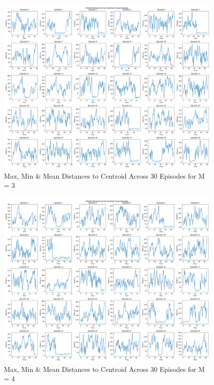 \begin{figure}
    \centering
    \includegraphics[width=0.8\linewidth]{figures/test8_without_trajectory/3_layers_distances_to_centroid.png}
    \caption{Max, Min \& Mean Distances to Centroid Across 30 Episodes for M = 3}
    \label{fig:dist_to_centroid_3_layers_30_ep}
\end{figure}
\begin{figure}
    \centering
    \includegraphics[width=0.8\linewidth]{figures/test8_without_trajectory/4_layers_distances_to_centroid.png}
    \caption{Max, Min \& Mean Distances to Centroid Across 30 Episodes for M = 4}
    \label{fig:dist_to_centroid_4_layers_30_ep}
\end{figure}
